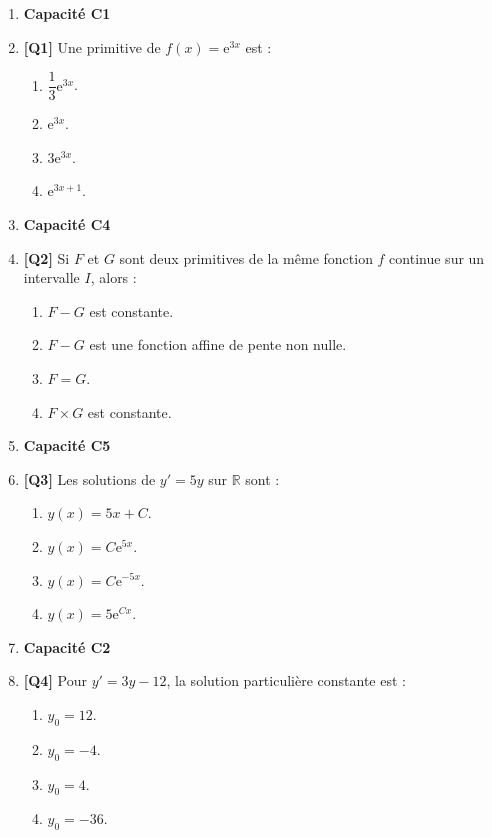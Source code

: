 \begin{enumerate}

\item[] \textbf{Capacité C1}

\item \textbf{[Q1]} Une primitive de $f(x) = \mathrm{e}^{3x}$ est :
  \begin{enumerate}[label=\Alph*.]
    \item $\dfrac{1}{3}\mathrm{e}^{3x}$.
    \item $\mathrm{e}^{3x}$.
    \item $3\mathrm{e}^{3x}$.
    \item $\mathrm{e}^{3x+1}$.
  \end{enumerate}

\item[] \textbf{Capacité C4}

\item \textbf{[Q2]} Si $F$ et $G$ sont deux primitives de la même fonction $f$ continue sur un intervalle $I$, alors :
  \begin{enumerate}[label=\Alph*.]
    \item $F-G$ est constante.
    \item $F-G$ est une fonction affine de pente non nulle.
    \item $F=G$.
    \item $F \times G$ est constante.
  \end{enumerate}

\item[] \textbf{Capacité C5}

\item \textbf{[Q3]} Les solutions de $y'=5y$ sur $\mathbb{R}$ sont :
  \begin{enumerate}[label=\Alph*.]
    \item $y(x) = 5x + C$.
    \item $y(x) = C\mathrm{e}^{5x}$.
    \item $y(x) = C\mathrm{e}^{-5x}$.
    \item $y(x) = 5\mathrm{e}^{Cx}$.
  \end{enumerate}

\item[] \textbf{Capacité C2}

\item \textbf{[Q4]} Pour $y' = 3y - 12$, la solution particulière constante est :
  \begin{enumerate}[label=\Alph*.]
    \item $y_0 = 12$.
    \item $y_0 = -4$.
    \item $y_0 = 4$.
    \item $y_0 = -36$.
  \end{enumerate}


\end{enumerate}
